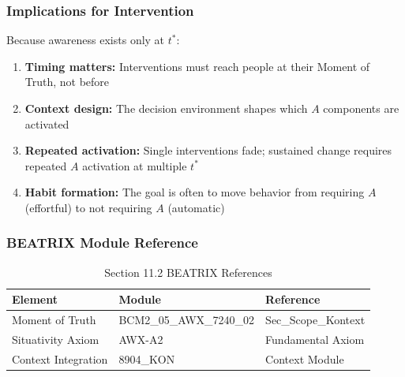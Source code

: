 \subsubsection{Implications for Intervention}

Because awareness exists only at $t^*$:

\begin{enumerate}
\item \textbf{Timing matters:} Interventions must reach people at their Moment 
of Truth, not before
\item \textbf{Context design:} The decision environment shapes which $A$ 
components are activated
\item \textbf{Repeated activation:} Single interventions fade; sustained change 
requires repeated $A$ activation at multiple $t^*$
\item \textbf{Habit formation:} The goal is often to move behavior from 
requiring $A$ (effortful) to not requiring $A$ (automatic)
\end{enumerate}

\subsubsection{BEATRIX Module Reference}

\begin{table}[htbp]
\centering
\caption{Section 11.2 BEATRIX References}
\label{tab:11-2-beatrix}
\renewcommand{\arraystretch}{1.3}
\begin{tabular}{@{}lll@{}}
\toprule
\textbf{Element} & \textbf{Module} & \textbf{Reference} \\
\midrule
Moment of Truth & BCM2\_05\_AWX\_7240\_02 & Sec\_Scope\_Kontext \\
Situativity Axiom & AWX-A2 & Fundamental Axiom \\
Context Integration & 8904\_KON & Context Module \\
\bottomrule
\end{tabular}
\end{table}

